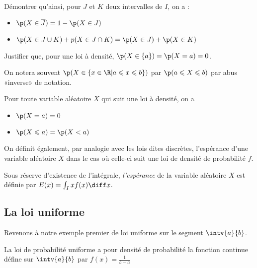 \documentclass[11pt,a4paper,french]{article}
\begin{document}
\begin{remarque}
  \begin{question}~\\
    Démontrer qu'ainsi, pour $J$ et $K$ deux intervalles de $I$, on a :
    \begin{itemize}
      \item $\p(X\in \overline{J}) = 1 - \p(X\in J)$
      \item $\p(X\in J \cup K) + p(X\in J \cap K) = \p(X\in J) + \p(X\in K)$
    \end{itemize}
    Justifier que, pour une loi à densité, $\p(X \in \{a\}) = \p(X = a)
    = 0$.
  \end{question}
\end{remarque}

On notera souvent $\p(X\in \{x\in \R | a\leqslant x \leqslant b\})$ par
$\p(a \leqslant X \leqslant b)$ par abus «inverse» de notation.

\begin{proposition}
  Pour toute variable aléatoire $X$ qui suit une loi à densité, on a
  \begin{itemize}
    \item $\p(X = a) = 0$
    \item $\p(X \leqslant a ) = \p(X < a)$
  \end{itemize}
\end{proposition}

On définit également, par analogie avec les lois dites discrètes,
l'espérance d'une variable aléatoire $X$ dans le cas où celle-ci suit
une loi de densité de probabilité $f$.

\begin{definition}
  Sous réserve d'existence de l'intégrale, \emph{l'espérance} de la
  variable aléatoire $X$ est définie par $E(x) = \int_I xf(x) \diff x$.
\end{definition}

\subsection{La loi uniforme}

Revenons à notre exemple premier de loi uniforme sur le segment
$\intv{a}{b}$.

\begin{definition}
  La loi de probabilité uniforme a pour densité de probabilité la
  fonction continue défine sur $\intv{a}{b}$ par $f(x) = \frac1{b-a}$
\end{definition}
\end{document}
